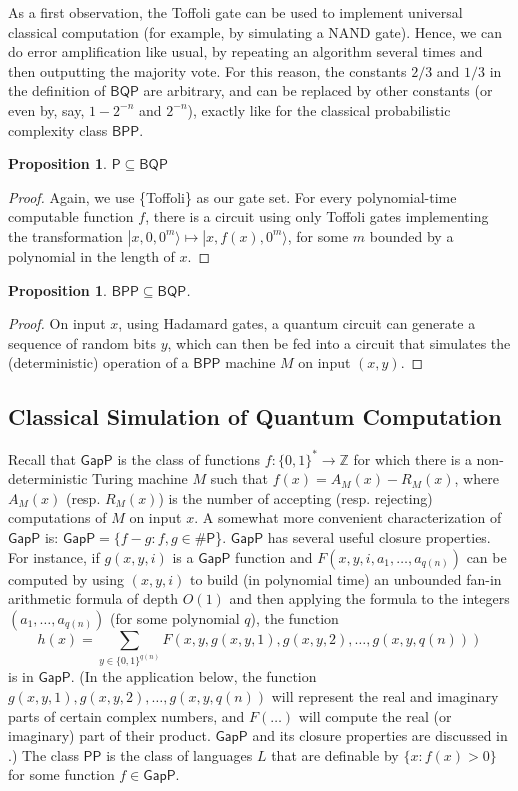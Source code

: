 \documentclass[11pt]{report}
\theoremstyle{plain}
\newtheorem{proposition}[theorem]{Proposition}
\theoremstyle{definition}
\renewcommand{\ket}[1]{|#1\rangle}
\begin{document}
As a first observation, the Toffoli gate can be used to implement universal classical computation (for example, by simulating a NAND gate).
Hence, we can do error amplification like usual, by repeating an algorithm several times and then outputting the majority vote.
 For this reason, the constants $2/3$ and $1/3$ in the definition of $\mathsf{BQP}$ are arbitrary, and can be replaced
by other constants (or even by, say, $1-2^{-n}$ and $2^{-n}$), exactly like for the classical probabilistic complexity class $\mathsf{BPP}$.

\begin{proposition}
$\mathsf{P} \subseteq \mathsf{BQP}$
\end{proposition}
\begin{proof}
Again, we use \{Toffoli\} as our gate set.  For every polynomial-time
computable function $f$, there is a circuit using only Toffoli gates
implementing the transformation
$\ket{x,0,0^m} \mapsto \ket{x,f(x),0^m}$, for some $m$ bounded by a
polynomial in the length of $x$.\end{proof}

\begin{proposition}
$\mathsf{BPP} \subseteq \mathsf{BQP}$.
\end{proposition}
\begin{proof}
On input $x$, using Hadamard gates, a quantum circuit can generate a sequence
of
random bits $y$, which can then be fed into a circuit that simulates the
(deterministic) operation of a $\mathsf{BPP}$ machine $M$ on input $(x,y)$.
\end{proof}

\subsection{Classical Simulation of Quantum Computation}

Recall that $\mathsf{GapP}$ is the class of functions $f:\{0,1\}^* \longrightarrow \mathbb{Z}$
for which there is a non-deterministic Turing machine $M$ such that $f(x)=A_M(x)-R_M(x)$,
where $A_M(x)$ (resp. $R_M(x)$) is the number of accepting (resp. rejecting) computations of $M$ on
input $x$.  A somewhat more convenient characterization of $\mathsf{GapP}$
is:  $\mathsf{GapP} = \{f-g : f,g \in \mathsf{\#P}$\}.  $\mathsf{GapP}$ has
several useful closure properties.  For instance, if $g(x,y,i)$
is a $\mathsf{GapP}$ function
and $F(x,y,i,a_1,\ldots,a_{q(n)})$ can be computed by using $(x,y,i)$ to
build (in polynomial time) an unbounded fan-in arithmetic formula of depth
$O(1)$ and then applying the formula to the integers
$(a_1,\ldots,a_{q(n)})$ (for some polynomial $q$), the function
\[
h(x) = \sum_{y \in \{0,1\}^{q(n)}} F(x,y,g(x,y,1),g(x,y,2),\ldots , g(x,y,q(n)))
\]
is in $\mathsf{GapP}$.  (In the application below, the function
$g(x,y,1),g(x,y,2),\ldots, g(x,y,q(n))$ will represent the real and
imaginary parts of certain complex numbers, and $F(\ldots)$ will compute the
real (or imaginary) part of their product.  $\mathsf{GapP}$ and its closure
properties are discussed in \cite{FFK94}.)
The class $\mathsf{PP}$ is the class of languages $L$ that are definable
by $\{x:f(x) >0\}$ for some function $f \in \mathsf{GapP}$.
\end{document}
